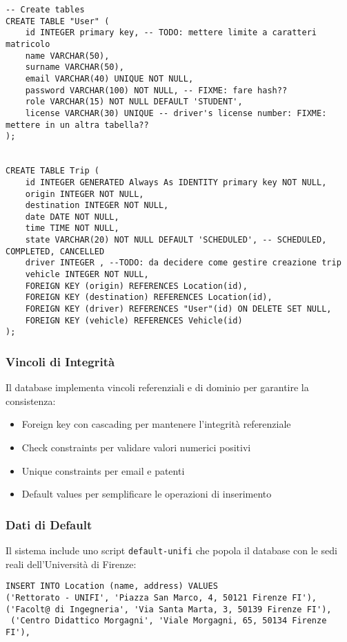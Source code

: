 \begin{lstlisting}[style=sql, caption={Esempio creazione tabelle User e Trip}]
-- Create tables
CREATE TABLE "User" (
    id INTEGER primary key, -- TODO: mettere limite a caratteri matricolo
    name VARCHAR(50),
    surname VARCHAR(50),
    email VARCHAR(40) UNIQUE NOT NULL,
    password VARCHAR(100) NOT NULL, -- FIXME: fare hash??
    role VARCHAR(15) NOT NULL DEFAULT 'STUDENT',
    license VARCHAR(30) UNIQUE -- driver's license number: FIXME: mettere in un altra tabella??
);


CREATE TABLE Trip (
    id INTEGER GENERATED Always As IDENTITY primary key NOT NULL,
    origin INTEGER NOT NULL,
    destination INTEGER NOT NULL,
    date DATE NOT NULL,
    time TIME NOT NULL,
    state VARCHAR(20) NOT NULL DEFAULT 'SCHEDULED', -- SCHEDULED, COMPLETED, CANCELLED
    driver INTEGER , --TODO: da decidere come gestire creazione trip
    vehicle INTEGER NOT NULL,
    FOREIGN KEY (origin) REFERENCES Location(id),
    FOREIGN KEY (destination) REFERENCES Location(id),
    FOREIGN KEY (driver) REFERENCES "User"(id) ON DELETE SET NULL,
    FOREIGN KEY (vehicle) REFERENCES Vehicle(id)
);
\end{lstlisting}
\subsubsection{Vincoli di Integrità}
Il database implementa vincoli referenziali e di dominio per garantire la consistenza:
\begin{itemize}
\item Foreign key con cascading per mantenere l'integrità referenziale
\item Check constraints per validare valori numerici positivi
\item Unique constraints per email e patenti
\item Default values per semplificare le operazioni di inserimento
\end{itemize}
\subsubsection{Dati di Default}
Il sistema include uno script \texttt{default-unifi} che popola il database con le sedi reali dell'Università di Firenze:
\begin{lstlisting}[style=sql, caption={Inserimento dati di default per le location}]
INSERT INTO Location (name, address) VALUES
('Rettorato - UNIFI', 'Piazza San Marco, 4, 50121 Firenze FI'),
('Facolt@ di Ingegneria', 'Via Santa Marta, 3, 50139 Firenze FI'),
 ('Centro Didattico Morgagni', 'Viale Morgagni, 65, 50134 Firenze FI'),
\end{lstlisting}

